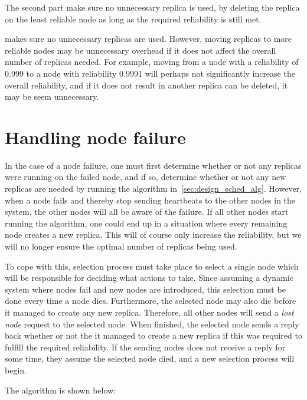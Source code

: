 \documentclass{cslthse-msc}
\begin{document}
The second part make sure no unnecessary replica is used, by deleting the replica on the least reliable node as long as the required reliability is still met.

 makes sure no unnecessary replicas are used. However, moving replicas to more reliable nodes may be unnecessary overhead if it does not affect the overall number of replicas needed. For example, moving from a node with a reliability of 0.999 to a node with reliability 0.9991 will perhaps not significantly increase the overall reliability, and if it does not result in another replica can be deleted, it may be seem unnecessary.

\section{Handling node failure} \label{sec:design_handling_failure}
In the case of a node failure, one must first determine whether or not any replicas were running on the failed node, and if so, determine whether or not any new replicas are needed by running the algorithm in~\cref{sec:design_sched_alg}. However, when a node fails and thereby stop sending heartbeats to the other nodes in the system, the other nodes will all be aware of the failure. If all other nodes start running the algorithm, one could end up in a situation where every remaining node creates a new replica. This will of course only increase the reliability, but we will no longer ensure the optimal number of replicas being used. 

To cope with this, selection process must take place to select a single node which will be responsible for deciding what actions to take. Since assuming a dynamic system where nodes fail and new nodes are introduced, this selection must be done every time a node dies. Furthermore, the selected node may also die before it managed to create any new replica. Therefore, all other nodes will send a \emph{lost node} request to the selected node. When finished, the selected node sends a reply back whether or not the it managed to create a new replica if this was required to fulfill the required reliability. If the sending nodes does not receive a reply for some time, they assume the selected node died, and a new selection process will begin.

The algorithm is shown below: %
\end{document}
